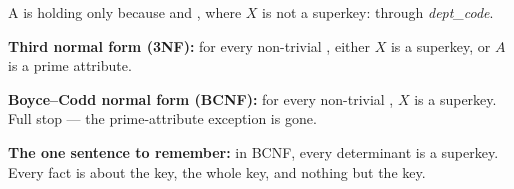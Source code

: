 \begin{definitionbox}
A  is  holding only because  and
, where $X$ is not a superkey:  through
\textit{dept\_code}.

\smallskip
\textbf{Third normal form (3NF):} for every non-trivial , either $X$
is a superkey, or $A$ is a prime attribute.

\smallskip
\textbf{Boyce--Codd normal form (BCNF):} for every non-trivial ,
$X$ is a superkey. Full stop --- the prime-attribute exception is gone.

\smallskip
\textbf{The one sentence to remember:} in BCNF, every determinant is a
superkey. Every fact is about the key, the whole key, and nothing but the key.
\end{definitionbox}

